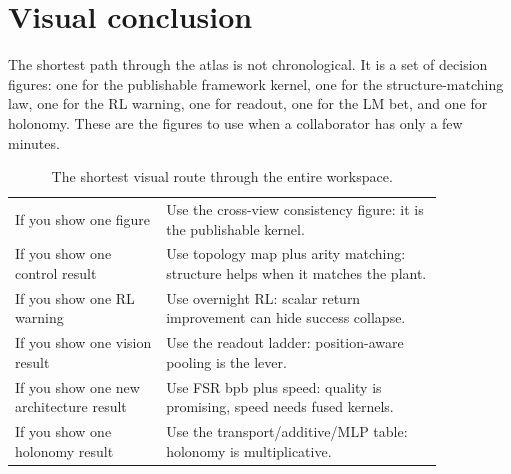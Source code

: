 \documentclass[10pt]{article}
\begin{document}
\section{Visual conclusion}

The shortest path through the atlas is not chronological. It is a set of
decision figures: one for the publishable framework kernel, one for the
structure-matching law, one for the RL warning, one for readout, one for the LM
bet, and one for holonomy. These are the figures to use when a collaborator has
only a few minutes.

\begin{table}[!htbp]\centering\small
\begin{tabular}{p{0.30\linewidth}p{0.55\linewidth}}
\toprule
If you show one figure & Use the cross-view consistency figure: it is the
publishable kernel. \\
If you show one control result & Use topology map plus arity matching: structure
helps when it matches the plant. \\
If you show one RL warning & Use overnight RL: scalar return improvement can
hide success collapse. \\
If you show one vision result & Use the readout ladder: position-aware pooling
is the lever. \\
If you show one new architecture result & Use FSR bpb plus speed: quality is
promising, speed needs fused kernels. \\
If you show one holonomy result & Use the transport/additive/MLP table:
holonomy is multiplicative. \\
\bottomrule
\end{tabular}
\caption{The shortest visual route through the entire workspace.}
\end{table}
\end{document}
